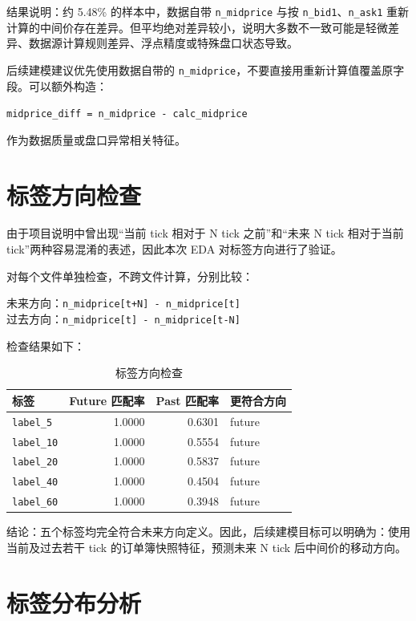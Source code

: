 \documentclass[UTF8,a4paper,12pt]{ctexart}
\begin{document}
结果说明：约 5.48\% 的样本中，数据自带 \texttt{n\_midprice} 与按 \texttt{n\_bid1}、\texttt{n\_ask1} 重新计算的中间价存在差异。但平均绝对差异较小，说明大多数不一致可能是轻微差异、数据源计算规则差异、浮点精度或特殊盘口状态导致。

后续建模建议优先使用数据自带的 \texttt{n\_midprice}，不要直接用重新计算值覆盖原字段。可以额外构造：

\begin{center}
\texttt{midprice\_diff = n\_midprice - calc\_midprice}
\end{center}

作为数据质量或盘口异常相关特征。

\section{标签方向检查}

由于项目说明中曾出现“当前 tick 相对于 N tick 之前”和“未来 N tick 相对于当前 tick”两种容易混淆的表述，因此本次 EDA 对标签方向进行了验证。

对每个文件单独检查，不跨文件计算，分别比较：

\begin{center}
未来方向：\texttt{n\_midprice[t+N] - n\_midprice[t]} \\
过去方向：\texttt{n\_midprice[t] - n\_midprice[t-N]}
\end{center}

检查结果如下：

\begin{table}[H]
\centering
\caption{标签方向检查}
\begin{tabular}{lrrl}
\toprule
标签 & Future 匹配率 & Past 匹配率 & 更符合方向 \\
\midrule
\texttt{label\_5} & 1.0000 & 0.6301 & future \\
\texttt{label\_10} & 1.0000 & 0.5554 & future \\
\texttt{label\_20} & 1.0000 & 0.5837 & future \\
\texttt{label\_40} & 1.0000 & 0.4504 & future \\
\texttt{label\_60} & 1.0000 & 0.3948 & future \\
\bottomrule
\end{tabular}
\end{table}

结论：五个标签均完全符合未来方向定义。因此，后续建模目标可以明确为：使用当前及过去若干 tick 的订单簿快照特征，预测未来 N tick 后中间价的移动方向。

\section{标签分布分析}
\end{document}
